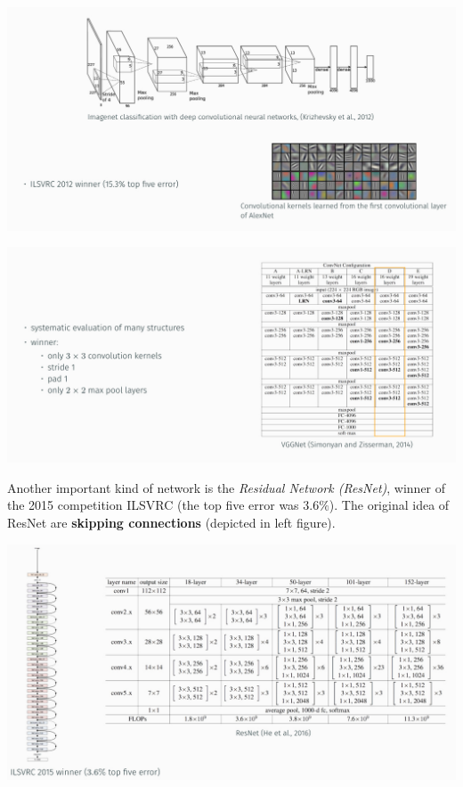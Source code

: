 \documentclass[10pt]{report}
\begin{document}
\begin{center}
\includegraphics[width=.9\linewidth]{./pics/cnn/alexnet.jpg}
\end{center}

\begin{center}
\includegraphics[width=.9\linewidth]{./pics/cnn/vggnet.jpg}
\end{center}

Another important kind of network is the \emph{Residual Network (ResNet)},
winner of the 2015 competition ILSVRC (the top five error was
\(3.6\%\)). The original idea of ResNet are \textbf{skipping connections}
(depicted in left figure).

\begin{center}
\includegraphics[width=.9\linewidth]{./pics/cnn/resnet.jpg}
\end{center}
\end{document}
